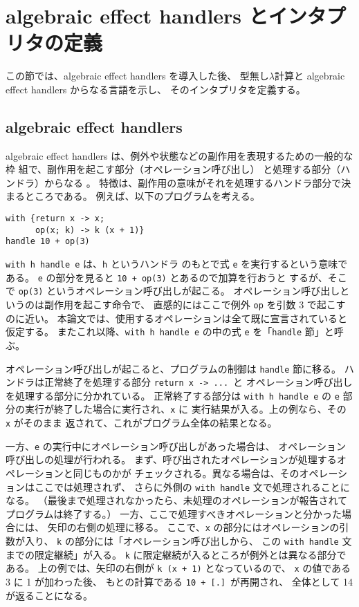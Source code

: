 \section{algebraic effect handlers とインタプリタの定義}
\label{section:definition}

この節では、algebraic effect handlers を導入した後、
型無し$\lambda$計算と algebraic effect handlers からなる言語を示し、
そのインタプリタを定義する。

\subsection{algebraic effect handlers}
\label{subsection:algebraic effect handlers}

algebraic effect handlers は、例外や状態などの副作用を表現するための一般的な枠
組で、副作用を起こす部分（オペレーション呼び出し）
と処理する部分（ハンドラ）からなる \cite{PRETNAR201519}。
特徴は、副作用の意味がそれを処理するハンドラ部分で決まるところである。
例えば、以下のプログラムを考える。
\vspace{-5pt}
\begin{verbatim}
with {return x -> x;
      op(x; k) -> k (x + 1)}
handle 10 + op(3)
\end{verbatim}
\vspace{-5pt}
\texttt{with h handle e} は、\texttt{h} というハンドラ
のもとで式 \texttt{e} を実行するという意味である。
\texttt{e} の部分を見ると \texttt{10 + op(3)} とあるので加算を行おうと
するが、そこで \texttt{op(3)} というオペレーション呼び出しが起こる。
オペレーション呼び出しというのは副作用を起こす命令で、
直感的にはここで例外 \texttt{op} を引数 3 で起こすのに近い。
本論文では、使用するオペレーションは全て既に宣言されていると仮定する。
またこれ以降、\texttt{with h handle e} の中の式 \texttt{e} を「\texttt{handle} 節」と呼ぶ。

オペレーション呼び出しが起こると、プログラムの制御は \texttt{handle} 節に移る。
ハンドラは正常終了を処理する部分 \texttt{return x -> ...}\ と
オペレーション呼び出しを処理する部分に分かれている。
正常終了する部分は
\texttt{with h handle e}
の \texttt{e} 部分の実行が終了した場合に実行され、\texttt{x} に
実行結果が入る。上の例なら、その \texttt{x} がそのまま
返されて、これがプログラム全体の結果となる。

一方、\texttt{e} の実行中にオペレーション呼び出しがあった場合は、
オペレーション呼び出しの処理が行われる。
まず、呼び出されたオペレーションが処理するオペレーションと同じものかが
チェックされる。異なる場合は、そのオペレーションはここでは処理されず、
さらに外側の \texttt{with handle} 文で処理されることになる。
（最後まで処理されなかったら、未処理のオペレーションが報告されて
プログラムは終了する。）
一方、ここで処理すべきオペレーションと分かった場合には、
矢印の右側の処理に移る。
ここで、\texttt{x} の部分にはオペレーションの引数が入り、
\texttt{k} の部分には「オペレーション呼び出しから、
この \texttt{with handle} 文までの限定継続」が入る。
\texttt{k} に限定継続が入るところが例外とは異なる部分である。
上の例では、矢印の右側が \texttt{k (x + 1)} となっているので、
\texttt{x} の値である 3 に 1 が加わった後、
もとの計算である \texttt{10 + [.]}\ が再開され、
全体として 14 が返ることになる。

